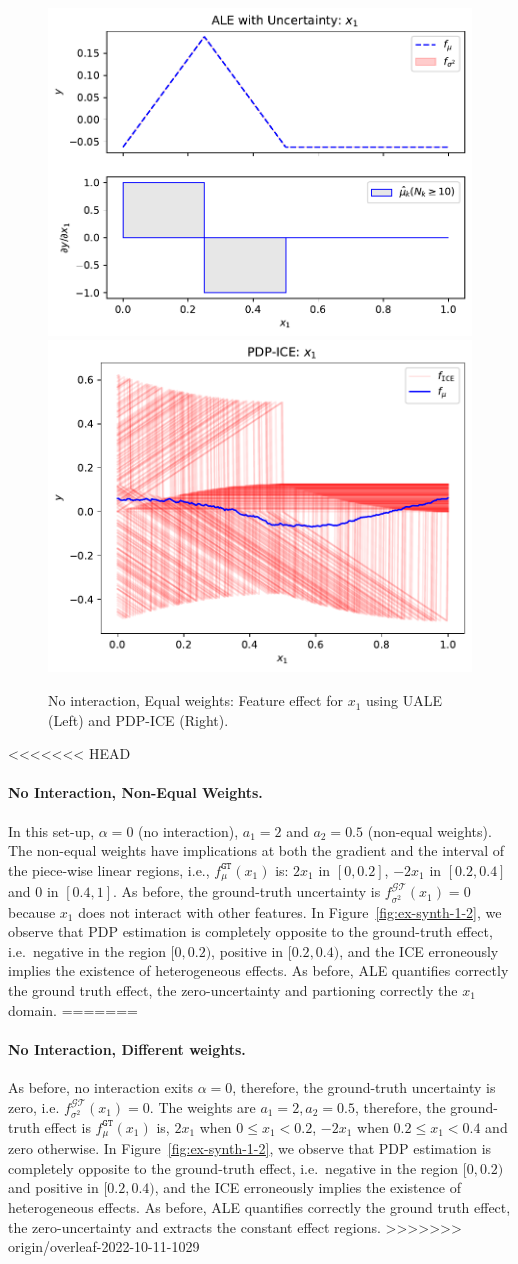 \documentclass[twoside]{article}
\begin{document}
\begin{figure}[h]
  \centering
  \includegraphics[width=.23\textwidth]{example_1/dale_feat_0.pdf}
  \includegraphics[width=.23\textwidth]{example_1/pdp_ice_feat_0.pdf}
  \caption{No interaction, Equal weights: Feature effect for \(x_1\)
    using UALE (Left) and PDP-ICE (Right).}
  \label{fig:synth-ex-1-case-1}
\end{figure}

<<<<<<< HEAD
\paragraph{No Interaction, Non-Equal Weights.}

In this set-up, \(\alpha=0\) (no interaction), \(a_1 = 2\) and
\(a_2= 0.5\) (non-equal weights). The non-equal weights have
implications at both the gradient and the interval of the piece-wise
linear regions, i.e., \(f_\mu^{\mathtt{GT}}(x_1)\) is: \(2x_1\) in
\([0, 0.2]\), \(-2x_1\) in \([0.2, 0.4]\) and \(0\) in \([0.4,
1]\). As before, the ground-truth uncertainty is
\(f^{\mathcal{GT}}_{\sigma^2}(x_1) = 0\) because \(x_1\) does not
interact with other features.  In Figure~\ref{fig:ex-synth-1-2}, we
observe that PDP estimation is completely opposite to the ground-truth
effect, i.e.~negative in the region \([0, 0.2)\), positive in
\([0.2, 0.4)\), and the ICE erroneously implies the existence of
heterogeneous effects. As before, ALE quantifies correctly the ground
truth effect, the zero-uncertainty and partioning correctly the
\(x_1\) domain.
=======
\paragraph{No Interaction, Different weights.}

As before, no interaction exits \(\alpha=0\), therefore, the
ground-truth uncertainty is zero, i.e.
\(f^{\mathcal{GT}}_{\sigma^2}(x_1) = 0\). The weights are
\(a_1=2, a_2=0.5\), therefore, the ground-truth effect is
\(f_\mu^{\mathtt{GT}}(x_1)\) is, \(2x_1\) when \(0 \leq x_1 < 0.2\),
\(-2x_1\) when \(0.2 \leq x_1 < 0.4\) and zero otherwise. In
Figure~\ref{fig:ex-synth-1-2}, we observe that PDP estimation is
completely opposite to the ground-truth effect, i.e.~negative in the
region \([0, 0.2)\) and positive in \([0.2, 0.4)\), and the ICE
erroneously implies the existence of heterogeneous effects. As before,
ALE quantifies correctly the ground truth effect, the
zero-uncertainty and extracts the constant effect regions.
>>>>>>> origin/overleaf-2022-10-11-1029
\end{document}
